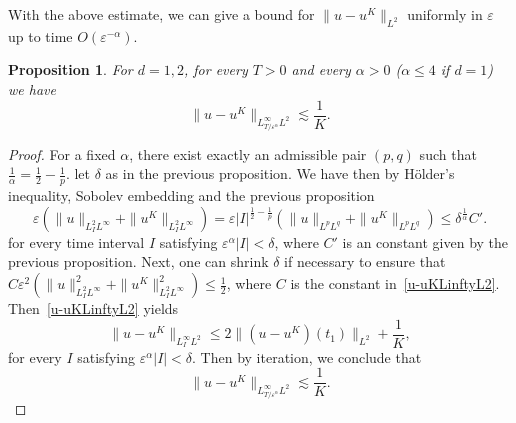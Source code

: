 \documentclass[10pt,a4paper]{article}
\newtheorem{proposition}[theorem]{Proposition}
\begin{document}
  With the above estimate, we can give a bound for \(\|u-u^K\|_{L^2}\) uniformly
  in \(\varepsilon\) up to time \(O(\varepsilon^{-\alpha})\).

  \begin{proposition}
    For \(d=1,2\), for every \(T>0\) and every \(\alpha>0\) (\(\alpha \leq 4\) if \(d=1\)) 
    we have 
    \begin{equation}
      \|u-u^K\|_{L^\infty_{T/\varepsilon^\alpha}L^2} \lesssim \frac1K.
    \end{equation}
  \end{proposition}

  \begin{proof}
    For a fixed \(\alpha\), there exist exactly an admissible pair \((p,q)\) such 
    that \(\frac1\alpha = \frac12 - \frac1p\). let \(\delta\) as in the previous 
    proposition. We have then by H\"older's inequality, Sobolev embedding and the
    previous proposition 
    \[ \varepsilon (\|u\|_{L^2_I L^\infty} + \|u^K\|_{L^2_I L^\infty}) = 
    \varepsilon |I|^{\frac12-\frac1p} (\|u\|_{L^p L^q} + \|u^K\|_{L^p L^q}) 
    \leq \delta^{\frac1\alpha} C'. \]
    for every time interval \(I\) satisfying \(\varepsilon^\alpha |I| <
    \delta\), where \(C'\) is an constant given by the previous proposition.
    Next, one can shrink \(\delta\) if necessary to ensure that
    \(C\varepsilon^2 (\|u\|_{L^2_I L^\infty}^2 + \|u^K\|_{L^2_I L^\infty}^2)
    \leq \frac12\), where \(C\) is the constant in~\eqref{u-uKLinftyL2}. 
    Then~\eqref{u-uKLinftyL2} yields 
    \[ \|u-u^K\|_{L^\infty_I L^2} \leq 2\|(u-u^K)(t_1)\|_{L^2} + \frac1K, \]
    for every \(I\) satisfying \(\varepsilon^\alpha |I| < \delta\). Then by
    iteration, we conclude that 
    \[ \|u-u^K\|_{L^\infty_{T/\varepsilon^\alpha}L^2} \lesssim \frac1K. \]
  \end{proof}
\end{document}
